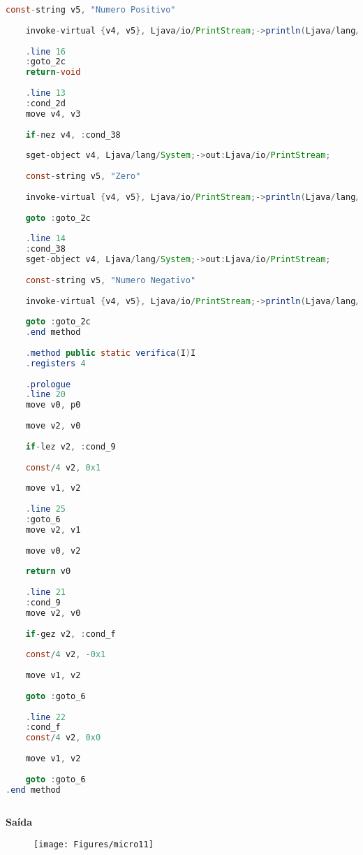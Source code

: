 \documentclass[hidelinks,12pt]{article}
\begin{document}
\begin{lstlisting}[caption=Smali resultante do .java,language=java]
	const-string v5, "Numero Positivo"
	
	invoke-virtual {v4, v5}, Ljava/io/PrintStream;->println(Ljava/lang/String;)V
	
	.line 16
	:goto_2c
	return-void
	
	.line 13
	:cond_2d
	move v4, v3
	
	if-nez v4, :cond_38
	
	sget-object v4, Ljava/lang/System;->out:Ljava/io/PrintStream;
	
	const-string v5, "Zero"
	
	invoke-virtual {v4, v5}, Ljava/io/PrintStream;->println(Ljava/lang/String;)V
	
	goto :goto_2c
	
	.line 14
	:cond_38
	sget-object v4, Ljava/lang/System;->out:Ljava/io/PrintStream;
	
	const-string v5, "Numero Negativo"
	
	invoke-virtual {v4, v5}, Ljava/io/PrintStream;->println(Ljava/lang/String;)V
	
	goto :goto_2c
	.end method
	
	.method public static verifica(I)I
	.registers 4
	
	.prologue
	.line 20
	move v0, p0
	
	move v2, v0
	
	if-lez v2, :cond_9
	
	const/4 v2, 0x1
	
	move v1, v2
	
	.line 25
	:goto_6
	move v2, v1
	
	move v0, v2
	
	return v0
	
	.line 21
	:cond_9
	move v2, v0
	
	if-gez v2, :cond_f
	
	const/4 v2, -0x1
	
	move v1, v2
	
	goto :goto_6
	
	.line 22
	:cond_f
	const/4 v2, 0x0
	
	move v1, v2
	
	goto :goto_6
.end method	
	
	\end{lstlisting}
	
	{\large{\textbf{Saída}}}
	
	\begin{figure}[!h]
		\centering
		\texttt{[image: Figures/micro11]}
	\end{figure}
\end{document}
